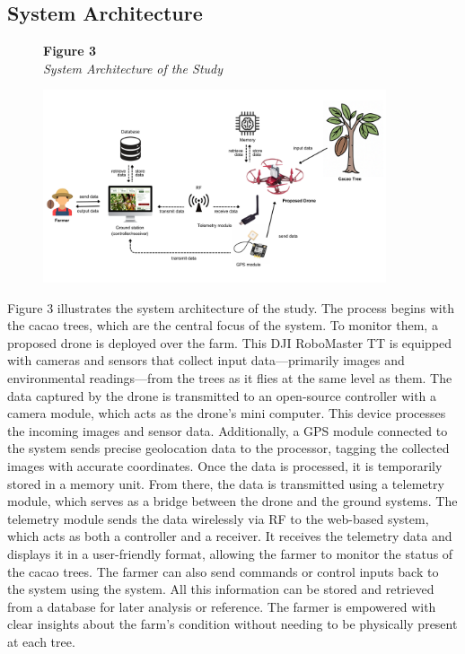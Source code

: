 	\subsection{System Architecture}
	
	\begin{figure}[H]
		\raggedright
		\textbf{Figure 3} \\ %
		\textit{System Architecture of the Study} %
		
		\vspace{0.5em}
		\centering
		\includegraphics[width=0.9\textwidth]{figures/SysArch.pdf} %
		
		\vspace{0.5em}
		\raggedright
		
		\label{fig:SysArch}
	\end{figure}
	
	Figure 3 illustrates the system architecture of the study. The process begins with the cacao trees, which are the central focus of the system. To monitor them, a proposed drone is deployed over the farm. This DJI RoboMaster TT is equipped with cameras and sensors that collect input data—primarily images and environmental readings—from the trees as it flies at the same level as them. The data captured by the drone is transmitted to an open-source controller with a camera module, which acts as the drone’s mini computer. This device processes the incoming images and sensor data. Additionally, a GPS module connected to the system sends precise geolocation data to the processor, tagging the collected images with accurate coordinates. Once the data is processed, it is temporarily stored in a memory unit. From there, the data is transmitted using a telemetry module, which serves as a bridge between the drone and the ground systems. The telemetry module sends the data wirelessly via RF to the web-based system, which acts as both a controller and a receiver. It receives the telemetry data and displays it in a user-friendly format, allowing the farmer to monitor the status of the cacao trees. The farmer can also send commands or control inputs back to the system using the system. All this information can be stored and retrieved from a database for later analysis or reference. The farmer is empowered with clear insights about the farm’s condition without needing to be physically present at each tree.
	
